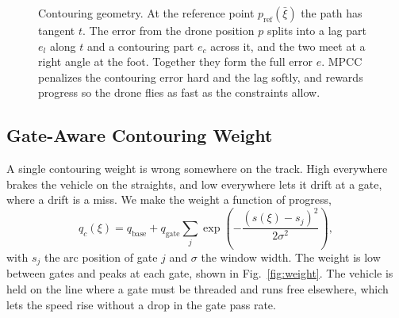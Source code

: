 \documentclass[conference]{IEEEtran}
\begin{document}
\begin{figure}[t]
\centering
{}
\caption{Contouring geometry. At the reference point $p_{\text{ref}}(\bar\xi)$ the path has tangent $t$. The error from the drone position $p$ splits into a lag part $e_l$ along $t$ and a contouring part $e_c$ across it, and the two meet at a right angle at the foot. Together they form the full error $e$. MPCC penalizes the contouring error hard and the lag softly, and rewards progress so the drone flies as fast as the constraints allow.}
\label{fig:contour}
\end{figure}

\subsection{Gate-Aware Contouring Weight}
\label{sec:gateweight}
A single contouring weight is wrong somewhere on the track. High everywhere brakes the vehicle on the straights, and low everywhere lets it drift at a gate, where a drift is a miss. We make the weight a function of progress,
\begin{equation}
q_c(\xi) = q_{\text{base}} + q_{\text{gate}} \sum_j \exp\!\left(-\frac{(s(\xi)-s_j)^2}{2\sigma^2}\right),
\label{eq:weight}
\end{equation}
with $s_j$ the arc position of gate $j$ and $\sigma$ the window width. The weight is low between gates and peaks at each gate, shown in Fig.~\ref{fig:weight}. The vehicle is held on the line where a gate must be threaded and runs free elsewhere, which lets the speed rise without a drop in the gate pass rate.
\end{document}
